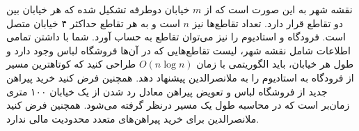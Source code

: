 نقشه شهر به این صورت است که از $m$ خیابان دوطرفه تشکیل شده که هر خیابان بین دو تقاطع قرار دارد. تعداد تقاطع‌ها نیز $n$ است و به هر تقاطع حداکثر ۴ خیابان متصل است. فرودگاه و استادیوم را نیز می‌توان تقاطع به حساب آورد.
شما با داشتن تمامی اطلاعات شامل نقشه شهر، لیست تقاطع‌هایی که در آن‌ها فروشگاه لباس وجود دارد و طول هر خیابان، باید الگوریتمی با زمان $O(n\log n)$ طراحی کنید که کوتاهترین مسیر از فرودگاه به استادیوم را به ملانصرالدین پیشنهاد دهد. همچنین فرض کنید  خرید پیراهن جدید از فروشگاه لباس و تعویض پیراهن معادل رد شدن از یک خیابان ۱۰۰ متری زمان‌بر است که در محاسبه طول یک مسیر درنظر گرفته می‌شود. همچنین فرض کنید ملانصرالدین برای خرید پیراهن‌های متعدد محدودیت مالی ندارد.



